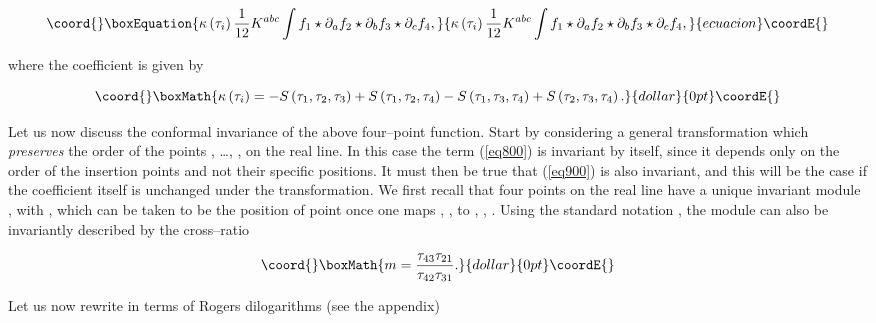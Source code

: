 \documentclass[a4paper,11pt]{article}
\providecommand{\mathbb}[1]{{\bf{#1}}}
\begin{document}
\begin{equation}\coord{}\boxEquation{
\kappa \left( \tau _{i}\right) \frac{1}{12}K^{abc}\int f_{1}\star \partial
_{a}f_{2}\star \partial _{b}f_{3}\star \partial _{c}f_{4},  \label{eq900}
}{
\kappa \left( \tau _{i}\right) \frac{1}{12}K^{abc}\int f_{1}\star \partial
_{a}f_{2}\star \partial _{b}f_{3}\star \partial _{c}f_{4},  }{ecuacion}\coordE{}\end{equation}

\noindent
where the coefficient \myHighlight{$\kappa$}\coordHE{} is given by 

$$\coord{}\boxMath{
\kappa \left( \tau _{i}\right) =-S\left( \tau _{1},\tau _{2},\tau
_{3}\right) +S\left( \tau _{1},\tau _{2},\tau _{4}\right) -S\left( \tau
_{1},\tau _{3},\tau _{4}\right) +S\left( \tau _{2},\tau _{3},\tau
_{4}\right) .
}{dollar}{0pt}\coordE{}$$

Let us now discuss the conformal invariance of the above four--point
function. Start by considering a general \myHighlight{$SL\left( 2,\mathbb{R}\right)$}\coordHE{}
transformation which \textit{preserves} the order of the points 
\coordHE{}, \dots, \coordHE{}, on the real line. In this case the term 
(\ref{eq800}) is invariant by itself, since it depends only on the order of 
the insertion points and not their specific positions. It must then be true 
that (\ref{eq900}) is also invariant, and this will be the case if 
the coefficient \coordHE{} itself is unchanged under 
the \myHighlight{$SL\left( 2,\mathbb{R}\right) $}\coordHE{} transformation. We first recall that 
four points on the real line have a unique invariant module \coordHE{}, with 
\coordHE{}, which can be taken to be the position of point \coordHE{} once one maps 
\coordHE{}, \coordHE{}, \coordHE{} to \coordHE{}, \coordHE{}, \myHighlight{$+\infty$}\coordHE{}. Using the 
standard notation \coordHE{}, the module \coordHE{} can also 
be invariantly described by the cross--ratio 

$$\coord{}\boxMath{
m=\frac{\tau _{43}\tau _{21}}{\tau _{42}\tau _{31}}.
}{dollar}{0pt}\coordE{}$$

\noindent
Let us now rewrite \myHighlight{$\kappa $}\coordHE{} in terms of Rogers dilogarithms (see the 
appendix)
\end{document}

